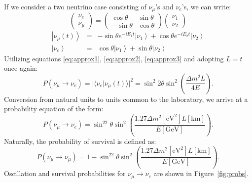 \documentclass[aps,prd,twocolumn,nofootinbib]{revtex4-1}
\begin{document}
If we consider a two neutrino case consisting of $\nu_{\mu}$'s and $\nu_e$'s, we can write:
\begin{equation}
  \begin{pmatrix}
    \nu_e \\
    \nu_{\mu}
  \end{pmatrix} = \begin{pmatrix}
    \cos\theta & \sin\theta \\
    -\sin\theta & \cos\theta
  \end{pmatrix}
  \begin{pmatrix}
    \nu_1 \\
    \nu_2
  \end{pmatrix}
\end{equation}
\begin{eqnarray}
  \left|\nu_{\mu}(t)\right\rangle &=& -\sin\theta e^{-iE_1t}\left|\nu_1\right\rangle+\cos\theta e^{-iE_2t}\left|\nu_2\right\rangle \\
  \left|\nu_e\right\rangle &=& \cos\theta\left|\nu_1\right\rangle+\sin\theta\left|\nu_2\right\rangle
\end{eqnarray}
Utilizing equations \ref{eq:approx1}, \ref{eq:approx2}, \ref{eq:approx3} and adopting $L=t$ once again:
\begin{equation}
  P(\nu_{\mu}\rightarrow\nu_e) = |\langle \nu_e | \nu_{\mu}(t)\rangle|^2 = \sin^2 2\theta \sin^2\left(\frac{\Delta m^2 L}{4E}\right).
\end{equation}
Conversion from natural units to units common to the laboratory, we arrive at a probability equation of the form:
\begin{equation}
  P(\nu_{\mu}\rightarrow\nu_e) = \sin^22\theta\sin^2\left(\frac{1.27\Delta m^2 \left[\text{eV}^2\right] L [\text{km}]}{E[\text{GeV}]}\right).
  \label{eq:osc}
\end{equation}
Naturally, the probability of survival is defined as:
\begin{equation}
  P(\nu_{\mu}\rightarrow\nu_{\mu}) = 1-\sin^22\theta\sin^2\left(\frac{1.27\Delta m^2 \left[\text{eV}^2\right] L [\text{km}]}{E[\text{GeV}]}\right).
  \label{eq:surv}
\end{equation}
Oscillation and survival probabilities for $\nu_\mu\rightarrow\nu_e$ are shown in Figure~\ref{fig:probs}.
\end{document}

